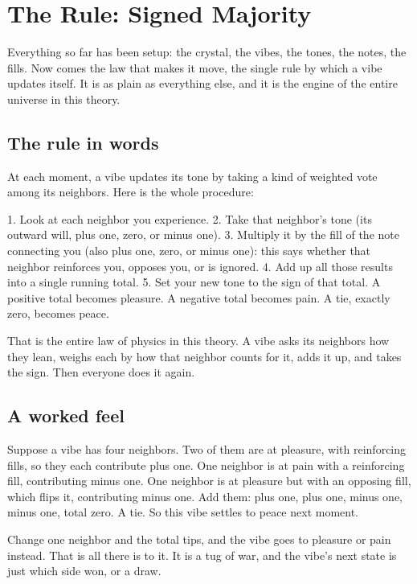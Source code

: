\section{The Rule: Signed Majority}

Everything so far has been setup: the crystal, the vibes, the tones, the notes, the fills. Now comes the law that makes it move, the single rule by which a vibe updates itself. It is as plain as everything else, and it is the engine of the entire universe in this theory.

\subsection{The rule in words}

At each moment, a vibe updates its tone by taking a kind of weighted vote among its neighbors. Here is the whole procedure:

1. Look at each neighbor you experience. 2. Take that neighbor's tone (its outward will, plus one, zero, or minus one). 3. Multiply it by the fill of the note connecting you (also plus one, zero, or minus one): this says whether that neighbor reinforces you, opposes you, or is ignored. 4. Add up all those results into a single running total. 5. Set your new tone to the sign of that total. A positive total becomes pleasure. A negative total becomes pain. A tie, exactly zero, becomes peace.

That is the entire law of physics in this theory. A vibe asks its neighbors how they lean, weighs each by how that neighbor counts for it, adds it up, and takes the sign. Then everyone does it again.

\subsection{A worked feel}

Suppose a vibe has four neighbors. Two of them are at pleasure, with reinforcing fills, so they each contribute plus one. One neighbor is at pain with a reinforcing fill, contributing minus one. One neighbor is at pleasure but with an opposing fill, which flips it, contributing minus one. Add them: plus one, plus one, minus one, minus one, total zero. A tie. So this vibe settles to peace next moment.

Change one neighbor and the total tips, and the vibe goes to pleasure or pain instead. That is all there is to it. It is a tug of war, and the vibe's next state is just which side won, or a draw.

